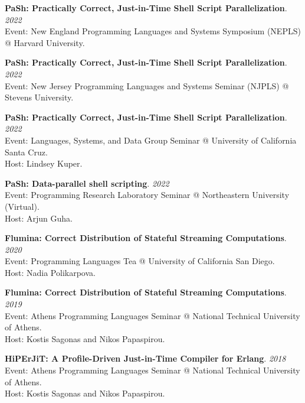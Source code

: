 \begin{minipage}{\textwidth}
\textbf{PaSh: Practically Correct, Just-in-Time Shell Script Parallelization}. \hfill {\em 2022}\\
Event: New England Programming Languages and Systems Symposium (NEPLS) @ Harvard University.
\end{minipage}

\begin{minipage}{\textwidth}
\textbf{PaSh: Practically Correct, Just-in-Time Shell Script Parallelization}. \hfill {\em 2022}\\
Event: New Jersey Programming Languages and Systems Seminar (NJPLS) @ Stevens University.
\end{minipage}

\begin{minipage}{\textwidth}
\textbf{PaSh: Practically Correct, Just-in-Time Shell Script Parallelization}. \hfill {\em 2022}\\
Event: Languages, Systems, and Data Group Seminar @ University of California Santa Cruz.\\
 Host: Lindsey Kuper.
\end{minipage}

\begin{minipage}{\textwidth}
\textbf{PaSh: Data-parallel shell scripting}. \hfill {\em 2022}\\
Event: Programming Research Laboratory Seminar @ Northeastern University (Virtual).\\
 Host: Arjun Guha.
\end{minipage}

\begin{minipage}{\textwidth}
\textbf{Flumina: Correct Distribution of Stateful Streaming Computations}. \hfill {\em 2020}\\
Event: Programming Languages Tea @ University of California San Diego.\\
 Host: Nadia Polikarpova.
\end{minipage}

\begin{minipage}{\textwidth}
\textbf{Flumina: Correct Distribution of Stateful Streaming Computations}. \hfill {\em 2019}\\
Event: Athens Programming Languages Seminar @ National Technical University of Athens.\\
 Host: Kostis Sagonas and Nikos Papaspirou.
\end{minipage}

\begin{minipage}{\textwidth}
\textbf{HiPErJiT: A Profile-Driven Just-in-Time Compiler for Erlang}. \hfill {\em 2018}\\
Event: Athens Programming Languages Seminar @ National Technical University of Athens.\\
 Host: Kostis Sagonas and Nikos Papaspirou.
\end{minipage}


